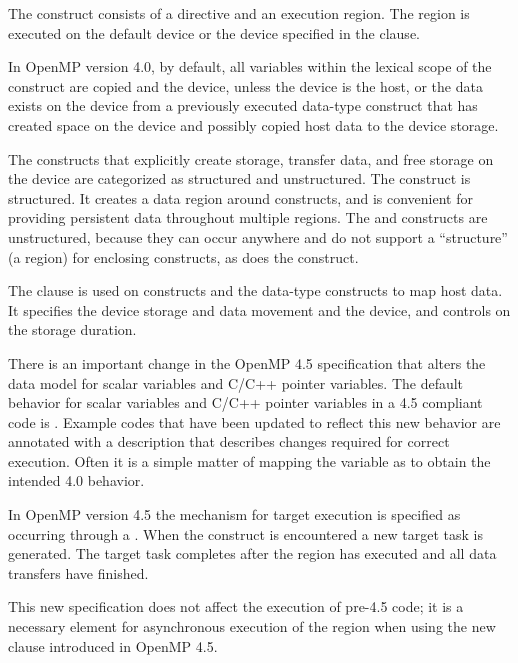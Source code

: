 \label{chap:devices}

The  construct consists of a  directive 
and an execution region. The  region is executed on
the default device or the device specified in the  
clause. 

In OpenMP version 4.0, by default, all variables within the lexical
scope of the construct are copied  and  the
device, unless the device is the host, or the data exists on the
device from a previously executed data-type construct that
has created space on the device and possibly copied host
data to the device storage.

The constructs that explicitly
create storage, transfer data, and free storage on the device
are categorized as structured and unstructured. The
 construct is structured. It creates
a data region around  constructs, and is
convenient for providing persistent data throughout multiple
 regions. The  and 
 constructs are unstructured, because 
they can occur anywhere and do not support a ``structure''
(a region) for enclosing  constructs, as does the
 construct. 

The  clause is used on  
constructs and the data-type constructs to map host data. It 
specifies the device storage and data movement  and 
the device, and controls on the storage duration.

There is an important change in the OpenMP 4.5 specification
that alters the data model for scalar variables and C/C++ pointer variables.
The default behavior for scalar variables and C/C++ pointer variables
in a 4.5 compliant code is . Example
codes that have been updated to reflect this new behavior are
annotated with a description that describes changes required
for correct execution. Often it is a simple matter of mapping
the variable as  to obtain the intended 4.0 behavior.

In OpenMP version 4.5 the mechanism for target
execution is specified as occurring through a . 
When the  construct is encountered a new 
target task is generated. The target task 
completes after the  region has executed and all data 
transfers have finished.

This new specification does not affect the execution of 
pre-4.5 code; it is a necessary element for asynchronous 
execution of the  region when using the new  
clause introduced in OpenMP 4.5.


